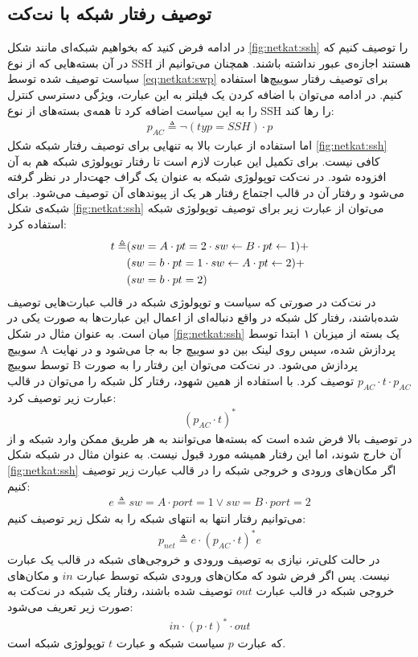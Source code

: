 \subsection{توصیف رفتار شبکه با نت‌کت}
در ادامه فرض کنید که بخواهیم شبکه‌ای مانند شکل
\ref{fig:netkat:ssh}
را توصیف کنیم که در آن بسته‌هایی که از نوع
SSH
هستند اجازه‌ی عبور نداشته باشند.
همچنان می‌توانیم از سیاست توصیف شده توسط
\ref{eq:netkat:swp}
برای توصیف رفتار سوییچ‌ها استفاده کنیم.
در ادامه می‌توان با اضافه کردن یک فیلتر به این عبارت، ویژگی دسترسی کنترل%
را به این سیاست اضافه کرد تا همه‌ی بسته‌های از نوع
SSH
را رها کند:
\begin{align*}
    p_{AC} \triangleq \neg(typ = SSH)\cdot p
\end{align*}
اما استفاده از عبارت بالا به تنهایی برای توصیف رفتار شبکه شکل
\ref{fig:netkat:ssh}
کافی‌ نیست.
برای تکمیل این عبارت لازم است تا رفتار توپولوژی%
شبکه‌ هم به آن افزوده شود.
در نت‌کت توپولوژی شبکه به عنوان یک گراف جهت‌دار در نظر گرفته می‌شود و رفتار آن در قالب اجتماع رفتار هر یک از پیوندهای%
آن توصیف می‌شود.
برای شبکه‌ی شکل
\ref{fig:netkat:ssh}
می‌توان از عبارت زیر برای توصیف توپولوژی شبکه استفاده کرد:
\begin{align*}
    t \triangleq & (sw = A \cdot pt = 2 \cdot sw \leftarrow B \cdot pt \leftarrow 1) + \\
                 & (sw = b \cdot pt = 1 \cdot sw \leftarrow A \cdot pt \leftarrow 2) + \\
                 & (sw = b \cdot pt = 2)
\end{align*}
در نت‌کت در صورتی که سیاست و توپولوژی شبکه در قالب عبارت‌هایی توصیف شده‌باشند،
رفتار کل شبکه در واقع دنباله‌ای از اعمال این عبارت‌ها به صورت یکی در میان است.
به عنوان مثال در شکل
\ref{fig:netkat:ssh}
یک بسته از میزبان ۱ ابتدا توسط سوییچ
A
پردازش شده، سپس روی لینک بین دو سوییچ جا به جا می‌شود و در نهایت توسط سوییچ
B
پردازش می‌شود.
در نت‌کت می‌توان این رفتار را به صورت
$p_{AC}\cdot t \cdot p_{AC}$
توصیف کرد.
با استفاده از همین شهود، رفتار کل شبکه را می‌توان در قالب عبارت زیر توصیف کرد:
\begin{align*}
    (p_{AC}\cdot t)^*
\end{align*}
در توصیف بالا فرض شده است که بسته‌ها می‌توانند به هر طریق ممکن وارد شبکه و از آن خارج شوند، اما این رفتار همیشه مورد قبول نیست.
به عنوان مثال در شبکه شکل
\ref{fig:netkat:ssh}
اگر مکان‌های ورودی و خروجی شبکه را در قالب عبارت زیر توصیف کنیم:
\begin{align*}
    e \triangleq sw = A\cdot port = 1 \vee sw = B \cdot port = 2
\end{align*}
می‌توانیم رفتار انتها به انتهای%
شبکه را به شکل زیر توصیف کنیم:
\begin{align*}
    p_{net} \triangleq e \cdot (p_{AC}\cdot t)^* e
\end{align*}
در حالت کلی‌تر، نیازی به توصیف ورودی و خروجی‌های شبکه در قالب یک عبارت نیست.
پس اگر فرض شود که مکان‌های ورودی شبکه توسط عبارت
$in$
و مکان‌های خروجی شبکه در قالب عبارت
$out$
توصیف شده‌ باشند، رفتار یک شبکه در نت‌کت به صورت زیر تعریف می‌شود:
\begin{align*}
    in \cdot (p\cdot t)^*\cdot out
\end{align*}
که عبارت
$p$
سیاست شبکه و عبارت
$t$
توپولوژی شبکه است.

